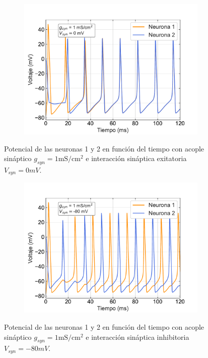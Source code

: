 \documentclass[11pt,twocolumn,twoside]{opticajnl}
\begin{document}
\begin{figure}[H]
\centering
    \begin{subfigure}[b]{\linewidth}
        \includegraphics[width=\textwidth]{Figuras/V_vs_t_1_0.pdf}
    \end{subfigure}
\caption{Potencial de las neuronas 1 y 2 en función del tiempo con acople sináptico $g_{syn} = 1 \text{mS}/\text{cm}^2$ e interacción sináptica exitatoria $V_{syn}=0 mV$.} 
\label{fig:V_vs_t_conacople_ext}
\end{figure}
\begin{figure}[H]
    \centering
    \begin{subfigure}[b]{\linewidth}
        \includegraphics[width=\textwidth]{Figuras/V_vs_t_1_-80.pdf}
    \end{subfigure}
    \caption{Potencial de las neuronas 1 y 2 en función del tiempo con acople sináptico $g_{syn} = 1 \text{mS}/\text{cm}^2$ e interacción sináptica inhibitoria $V_{syn}= -80 mV$.} 
    \label{fig:V_vs_t_conacople_inh}
\end{figure}
\end{document}
